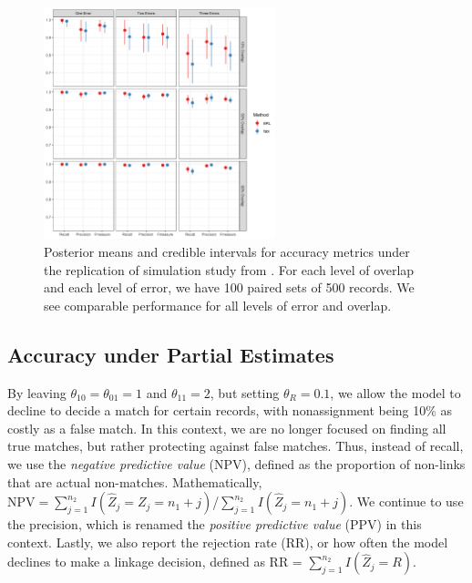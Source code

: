 \documentclass[12pt,letterpaper]{article}
\newcommand{\1}[1]{\mathbb{I}\!\left[#1\right]} %
\begin{document}
\begin{figure}[h!]
	\begin{center}
\includegraphics[width=0.6\textwidth]{../notes/figures/sadinle_sim_plot2} 
\caption{Posterior means and credible intervals for accuracy metrics under the replication of simulation study from \cite{sadinle_bayesian_2017}. For each level of overlap and each level of error, we have 100 paired sets of 500 records. We see comparable performance for all levels of error and overlap.}
\label{fig:sadinle_simulation}
	\end{center}
\end{figure}

\hypertarget{partial}{%
	\subsection{Accuracy under Partial Estimates}\label{partial}}

By leaving $\theta_{10} = \theta_{01} = 1$ and $\theta_{11} = 2$, but setting $\theta_R = 0.1$, we allow the model to decline to decide a match for certain records, with nonassignment being 10\% as costly as a false match. In this context, we are no longer focused on finding all true matches, but rather protecting against false matches. Thus, instead of recall, we use the \emph{negative predictive value} (NPV), defined as the proportion of non-links that are actual non-matches. Mathematically, $\text{NPV} = \sum_{j=1}^{n_2} I(\hat{Z}_j = Z_j = n_1 + j)$/$\sum_{j=1}^{n_2} I(\hat{Z}_j = n_1 + j)$. We continue to use the precision, which is renamed the \emph{positive predictive value} (PPV) in this context. Lastly, we also report the rejection rate (RR), or how often the model declines to make a linkage decision, defined as RR = $\sum_{j=1}^{n_2} I(\hat{Z}_j = R)$.
\end{document}
